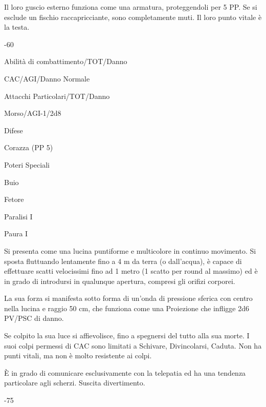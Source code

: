 Il loro guscio esterno funziona come una armatura, proteggendoli per 5
PP. Se si esclude un fischio raccapricciante, sono completamente muti.
Il loro punto vitale \`e la testa.

 {-}{60}

\begin{parmostro}{Abilit\`a di combattimento/TOT/Danno}
\item CAC/AGI/Danno Normale
\end{parmostro}

\begin{parmostro}{Attacchi Particolari/TOT/Danno}
\item Morso/AGI-1/2d8 
\end{parmostro}

\begin{parmostro}{Difese}
\item Corazza (PP 5)
\end{parmostro}

\begin{parmostro}{Poteri Speciali}
\item Buio
\item Fetore
\item Paralisi I
\item Paura I
\end{parmostro}


Si presenta come una lucina puntiforme e multicolore in continuo
movimento.  Si sposta fluttuando lentamente fino a 4 m da terra (o
dall'acqua), \`e capace di effettuare scatti velocissimi fino ad 1
metro (1 scatto per round al massimo) ed \`e in grado di introdursi
in qualunque apertura, compresi gli orifizi corporei. 

La sua forza si manifesta sotto forma di un'onda di pressione sferica
con centro nella lucina e raggio 50 cm, che funziona come una
Proiezione che infligge 2d6 PV/PSC di danno.

Se colpito la sua luce si affievolisce, fino a
spegnersi del tutto alla sua morte. I suoi colpi permessi di CAC sono
limitati a Schivare, Divincolarsi, Caduta. Non ha punti vitali, ma non
\`e molto resistente ai colpi. 

\`E in grado di comunicare esclusivamente con la telepatia ed ha una
tendenza particolare agli scherzi. Suscita divertimento.

 {-}{75}

